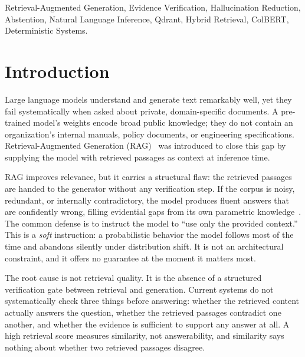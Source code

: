 \documentclass[conference]{IEEEtran}
\begin{document}
\begin{IEEEkeywords}
Retrieval-Augmented Generation, Evidence Verification, Hallucination
Reduction, Abstention, Natural Language Inference, Qdrant, Hybrid Retrieval,
ColBERT, Deterministic Systems.
\end{IEEEkeywords}

\section{Introduction}
\label{sec:intro}

Large language models understand and generate text remarkably well, yet
they fail systematically when asked about private, domain-specific
documents. A pre-trained model's weights encode broad public knowledge;
they do not contain an organization's internal manuals, policy documents,
or engineering specifications. Retrieval-Augmented Generation
(RAG)~\cite{lewis2020rag} was introduced to close this gap by supplying the
model with retrieved passages as context at inference time.

RAG improves relevance, but it carries a structural flaw: the retrieved
passages are handed to the generator without any verification step. If the
corpus is noisy, redundant, or internally contradictory, the model produces
fluent answers that are confidently wrong, filling evidential gaps from its
own parametric knowledge~\cite{wu2024ragtruth, shuster2021retrieval}. The
common defense is to instruct the model to ``use only the provided
context.'' This is a \textit{soft} instruction: a probabilistic behavior
the model follows most of the time and abandons silently under distribution
shift. It is not an architectural constraint, and it offers no guarantee at
the moment it matters most.

The root cause is not retrieval quality. It is the absence of a structured
verification gate between retrieval and generation. Current systems do not
systematically check three things before answering: whether the retrieved
content actually answers the question, whether the retrieved passages
contradict one another, and whether the evidence is sufficient to support
any answer at all. A high retrieval score measures similarity, not
answerability, and similarity says nothing about whether two retrieved
passages disagree.
\end{document}

